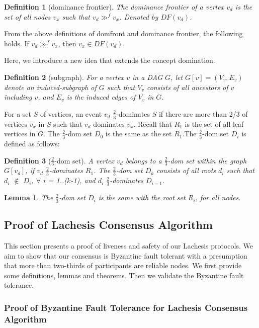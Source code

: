 \documentclass{article}
\newtheorem{lem}[thm]{Lemma}
\newtheorem{defn}{Definition}[section]
\newcommand{\domf}{\gg^{f}}
\begin{document}
\begin{defn}[dominance frontier]
	The dominance frontier of a vertex $v_d$ is the set of all nodes $v_x$ such that $v_d \domf v_x$. Denoted by $DF(v_d)$.
\end{defn}

From the above definitions of domfront and dominance frontier, the following holds. If $v_d \domf v_x$, then $v_x \in DF(v_d)$.


Here, we introduce a new idea that extends the concept domination.

\begin{defn}[subgraph] 
	For a vertex $v$ in a DAG $G$, let $G[v] = (V_v,E_v)$ denote an induced-subgraph of $G$ such that $V_v$ consists of all ancestors of $v$ including $v$, and $E_v$ is the induced edges of $V_v$ in $G$.
\end{defn}



For a set $S$ of vertices, an event $v_d$  $\frac{2}{3}$-dominates $S$ if there are more than 2/3 of vertices $v_x$ in $S$ such that $v_d$ dominates $v_x$. 	
Recall that $R_1$ is the set of all leaf vertices in $G$. The $\frac{2}{3}$-dom set $D_0$ is the same as the set $R_1$.The $\frac{2}{3}$-dom set $D_i$ is defined as follows:	
\begin{defn}[$\frac{2}{3}$-dom set]	
	A vertex $v_d$ belongs to a $\frac{2}{3}$-dom set  within the graph $G[v_d]$, if $v_d$ $\frac{2}{3}$-dominates $R_1$.
	The $\frac{2}{3}$-dom set $D_k$ consists of all roots $d_i$ such that  $d_i$ $\not \in $ $D_i$, $\forall$ $i$ = 1..($k$-1), and $d_i$ $\frac{2}{3}$-dominates $D_{i-1}$.
\end{defn}


\begin{lem}
	The $\frac{2}{3}$-dom set $D_i$ is the same with the root set $R_i$, for all nodes.
\end{lem}

\subsection{Proof of Lachesis Consensus Algorithm}\label{se:proof}
This section presents a proof of liveness and safety  of our Lachesis protocols. We aim to show that our consensus is Byzantine fault tolerant with a presumption that more than two-thirds of participants are reliable nodes. We first provide some definitions, lemmas and theorems. Then we validate the Byzantine fault tolerance. 

\subsubsection{Proof of Byzantine Fault Tolerance for Lachesis Consensus Algorithm}
\end{document}
